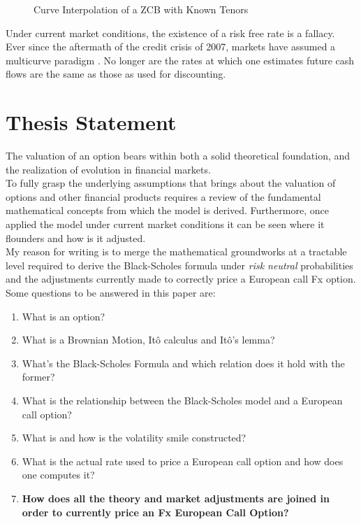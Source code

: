\documentclass{article}
\begin{document}
\begin{figure}[h]
    \centering
    \caption{Curve Interpolation of a ZCB with Known Tenors}
\end{figure}

Under current market conditions, the existence of a risk free rate is a fallacy. Ever since the aftermath of the credit crisis of 2007, markets have assumed a multicurve paradigm \citep{len}. No longer are the rates at which one estimates future cash flows are the same as those as used for discounting.

\section{Thesis Statement}
The valuation of an option bears within both a solid theoretical foundation, and the realization of evolution in financial markets.\\

To fully grasp the underlying assumptions that brings about the valuation of  options and other financial products requires a review of the fundamental mathematical concepts from which the model is derived. Furthermore, once applied the model under current market conditions it can be seen where it flounders and how is it adjusted.\\

My reason for writing is to merge the mathematical groundworks at a tractable level required to derive the Black-Scholes formula under \textit{risk neutral} probabilities and the adjustments currently made to correctly price a European call Fx option.\\

Some questions to be answered in this paper are:
\begin{enumerate}
  \item What is an option?
  \item What is a Brownian Motion, It\^{o} calculus and It\^{o}'s lemma?
  \item What's the Black-Scholes Formula and which relation does it hold with the former?
  \item What is the relationship between the Black-Scholes model and a European call option?
  \item What is and how is the volatility smile constructed?
  \item What is the actual rate used to price a European call option and how does one computes it?
  \item \textbf{How does all the theory and market adjustments are joined in order to currently price an Fx European Call Option?}
\end{enumerate}


\newpage
\nocite{*}

\end{document}
